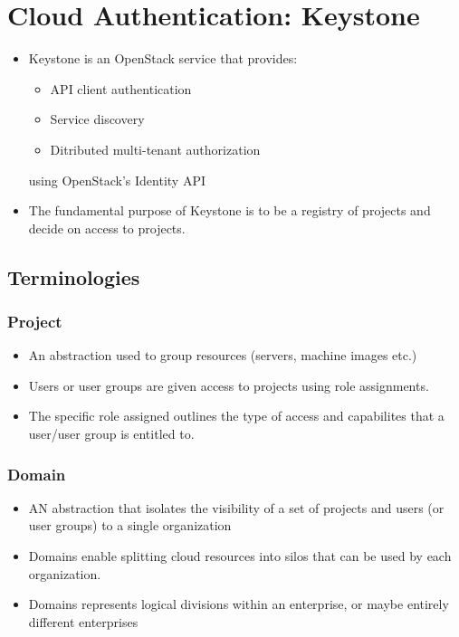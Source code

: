 \documentclass{article}
\begin{document}
\section{Cloud Authentication: Keystone}
\begin{itemize}
    \item Keystone is an OpenStack service that provides:
    \begin{itemize}
        \item API client authentication
        
        \item Service discovery
        
        \item Ditributed multi-tenant authorization
    \end{itemize}
    using OpenStack's Identity API
    
    \item The fundamental purpose of Keystone is to be a registry of projects and decide on access to projects. 
\end{itemize}

\subsection{Terminologies}
\subsubsection{Project}
\begin{itemize}
    \item An abstraction used to group resources (servers, machine images etc.)
    
    \item Users or user groups are given access to projects using role assignments. 
    
    \item The specific role assigned outlines the type of access and capabilites that a user/user group is entitled to.
\end{itemize}

\subsubsection{Domain}
\begin{itemize}
    \item AN abstraction that isolates the visibility of a set of projects and users (or user groups) to a single organization
    
    \item Domains enable splitting cloud resources into silos that can be used by each organization. 
    
    \item Domains represents logical divisions within an enterprise, or maybe entirely different enterprises
\end{itemize}
\end{document}
